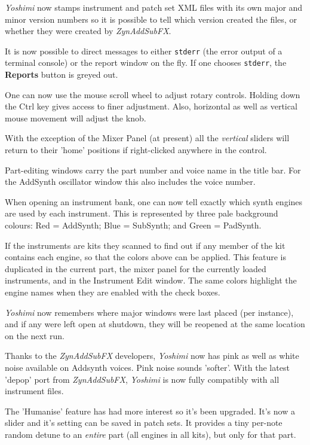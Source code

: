 \documentclass[
 11pt,
 twoside,
 a4paper,
 final                                 %
]{article}
\begin{document}
   \textsl{Yoshimi} now stamps instrument and patch set XML files with its own
   major and minor version numbers so it is possible to tell which version
   created the files, or whether they were created by \textsl{ZynAddSubFX}.

   It is now possible to direct messages to either \texttt{stderr}
   (the error output of a terminal console) or the report window
   on the fly. If one chooses \texttt{stderr}, the \textbf{Reports} button is
   greyed out.

   One can now use the mouse scroll wheel to adjust rotary controls. Holding
   down the Ctrl key gives access to finer adjustment.  Also, horizontal as
   well as vertical mouse movement will adjust the knob.

   With the exception of the Mixer Panel (at present) all the
   \textsl{vertical} sliders will return to their 'home' positions if
   right-clicked anywhere in the control.

   Part-editing windows carry the part number and voice name in the title bar.
   For the AddSynth oscillator window this also includes the voice number.

   When opening an instrument bank, one can now tell exactly which synth
   engines are used by each instrument. This is represented by three pale
   background colours: Red = AddSynth; Blue = SubSynth; and Green = PadSynth.

   If the instruments are kits they scanned to find out if any member of the
   kit contains each engine, so that the colors above can be applied.
   This feature is duplicated in the current part, the mixer panel for the
   currently loaded instruments, and in the Instrument Edit window.
   The same colors highlight the engine names when they are enabled with the
   check boxes. 

   \textsl{Yoshimi} now remembers where major windows were last placed (per
   instance), and if any were left open at shutdown, they will be reopened at
   the same location on the next run.

   Thanks to the \textsl{ZynAddSubFX} developers, \textsl{Yoshimi} now has pink
   as well as white noise available on Addsynth voices. Pink noise sounds
   'softer'.  With the latest 'depop' port from \textsl{ZynAddSubFX},
   \textsl{Yoshimi} is now fully compatibly with all instrument files.

   The 'Humanise' feature has had more interest so it's been upgraded. It's now
   a slider and it's setting can be saved in patch sets. It provides a tiny
   per-note random detune to an \textsl{entire} part (all engines in all kits),
   but only for that part.
\end{document}
